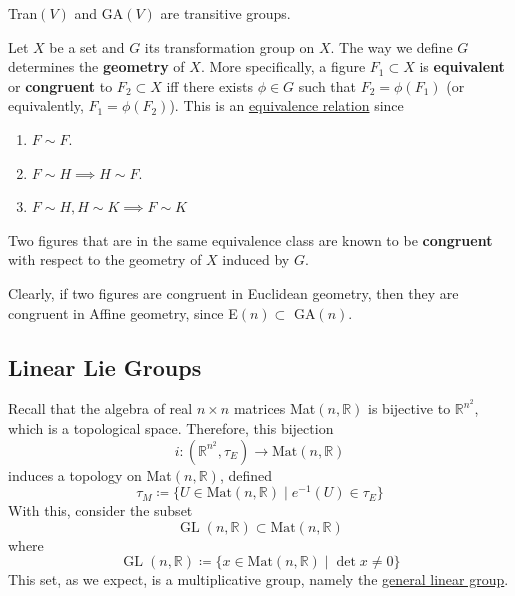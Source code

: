 \documentclass{article}
\DeclareMathOperator{\GL}{GL}
\newcounter{definition}[section]
\newcounter{example}[section]
\begin{document}
    \begin{example}
      \label{ex:transitivity-of-tranv-and-gav}
      Tran$(V)$ and GA$(V)$ are transitive groups. 
    \end{example}

    \begin{definition}
      \label{def:congruence-classes}
      Let $X$ be a set and $G$ its transformation group on $X$. The way we define $G$ determines the \textbf{geometry} of $X$. More specifically, a figure $F_{1} \subset X$ is \textbf{equivalent} or \textbf{congruent} to $F_{2} \subset X$ iff there exists $\phi \in G$ such that $F_{2} = \phi (F_{1})$ (or equivalently, $F_{1} = \phi (F_{2})$). This is an \hyperref[st-def:equivalence_relation]{equivalence relation} since
      \begin{enumerate}
        \item $F \sim F$. 
        \item $F \sim H \implies H \sim F$. 
        \item $F \sim H, H \sim K \implies F \sim K$
      \end{enumerate}
      Two figures that are in the same equivalence class are known to be \textbf{congruent} with respect to the geometry of $X$ induced by $G$. 
    \end{definition}

    Clearly, if two figures are congruent in Euclidean geometry, then they are congruent in Affine geometry, since E$(n) \subset$ GA$(n)$. 



  \subsection{Linear Lie Groups}

    Recall that the algebra of real $n \times n$ matrices Mat$(n, \mathbb{R})$ is bijective to $\mathbb{R}^{n^2}$, which is a topological space. Therefore, this bijection 
    \begin{equation}
      i:(\mathbb{R}^{n^2}, \tau_E) \rightarrow \text{Mat}(n, \mathbb{R})
    \end{equation}
    induces a topology on Mat$(n, \mathbb{R})$, defined 
    \begin{equation}
      \tau_M \coloneqq \{U \in \text{Mat}(n, \mathbb{R}) \; | \; e^{-1} (U) \in \tau_E\}
    \end{equation}
    With this, consider the subset
    \begin{equation}
      \GL(n, \mathbb{R}) \subset \text{Mat}(n, \mathbb{R})
    \end{equation}
    where
    \begin{equation}
      \GL(n, \mathbb{R}) \coloneqq \{x \in \text{Mat}(n, \mathbb{R}) \;|\; \det{x} \neq 0\}
    \end{equation}
    This set, as we expect, is a multiplicative group, namely the \hyperref[lin-def:general-linear-group]{general linear group}. 
\end{document}
